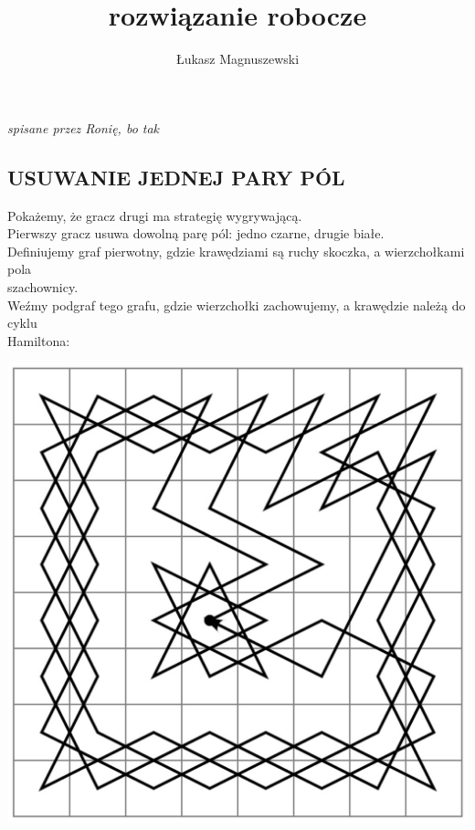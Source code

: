\documentclass{article}
\title{\ttfamily {\color{emp}SKOCZEK}\medskip\\ \normalsize {\color{dygresyja}rozwiązanie robocze}}
\author{{\color{tit}Łukasz Magnuszewski}}
\date{}
\begin{document}
\ttfamily
\maketitle\smallskip
\begin{center}\emph{\scriptsize\color{dygresyja}spisane przez Ronię, bo tak}\end{center}

\subsection*{USUWANIE JEDNEJ PARY PÓL}
Pokażemy, że gracz drugi ma strategię wygrywającą.\smallskip\\
Pierwszy gracz usuwa dowolną parę pól: jedno czarne, drugie białe. \bigskip\\
Definiujemy graf pierwotny, gdzie krawędziami są ruchy skoczka, a wierzchołkami pola \\szachownicy.\medskip\\
Weźmy podgraf tego grafu, gdzie wierzchołki zachowujemy, a krawędzie należą do cyklu \\Hamiltona:\bigskip\\
\begin{center}
\includegraphics[scale=0.2]{podpierdalanko.png}
\end{center}\bigskip
\end{document}
